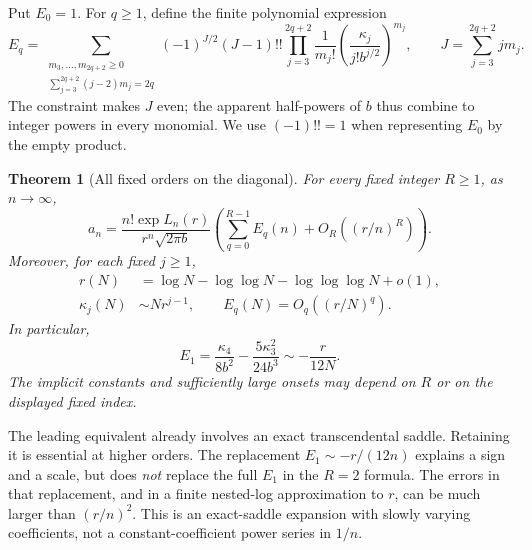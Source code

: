 \documentclass[11pt,letterpaper]{article}
\numberwithin{equation}{section}
\newtheorem{theorem}{Theorem}[section]
\theoremstyle{definition}\newtheorem{definition}[theorem]{Definition}
\theoremstyle{remark}\newtheorem{remark}[theorem]{Remark}
\begin{document}
Put $E_0=1$. For $q\geq1$, define the finite polynomial expression
\begin{equation}\label{sfp:pc:eq:Ek}
 E_q=\sum_{\substack{m_3,\ldots,m_{2q+2}\geq0\\
                    \sum_{j=3}^{2q+2}(j-2)m_j=2q}}
 (-1)^{J/2}(J-1)!!
 \prod_{j=3}^{2q+2}\frac1{m_j!}
       \left(\frac{\kappa_j}{j!b^{j/2}}\right)^{m_j},
 \qquad J=\sum_{j=3}^{2q+2}jm_j.
\end{equation}
The constraint makes $J$ even; the apparent half-powers of $b$ thus
combine to integer powers in every monomial. We use $(-1)!!=1$
when representing $E_0$ by the empty product.

\begin{theorem}[All fixed orders on the diagonal]\label{sfp:pc:thm:main}
For every fixed integer $R\geq1$, as $n\to\infty$,
\begin{equation}\label{sfp:pc:eq:main}
 a_n=\frac{n!\exp L_n(r)}{r^n\sqrt{2\pi b}}
       \left(\sum_{q=0}^{R-1}E_q(n)+O_R\left((r/n)^R\right)\right).
\end{equation}
Moreover, for each fixed $j\geq1$,
\begin{align}
 r(N)&=\log N-\log\log N-\log\log\log N+o(1),\label{sfp:pc:eq:rscale}\\
 \kappa_j(N)&\sim Nr^{j-1},\qquad
 E_q(N)=O_q\left((r/N)^q\right).\label{sfp:pc:eq:kappascale}
\end{align}
In particular,
\begin{equation}\label{sfp:pc:eq:E1}
 E_1=\frac{\kappa_4}{8b^2}
       -\frac{5\kappa_3^2}{24b^3}
       \sim-\frac{r}{12N}.
\end{equation}
The implicit constants and sufficiently large onsets may depend on
$R$ or on the displayed fixed index.
\end{theorem}

The leading equivalent already involves an exact transcendental
saddle. Retaining it is essential at higher orders. The replacement
$E_1\sim-r/(12n)$ explains a sign and a scale, but does \emph{not}
replace the full $E_1$ in the $R=2$ formula. The errors in that
replacement, and in a finite nested-log approximation to $r$, can
be much larger than $(r/n)^2$. This is an exact-saddle expansion with
slowly varying coefficients, not a constant-coefficient power series
in $1/n$.
\end{document}
